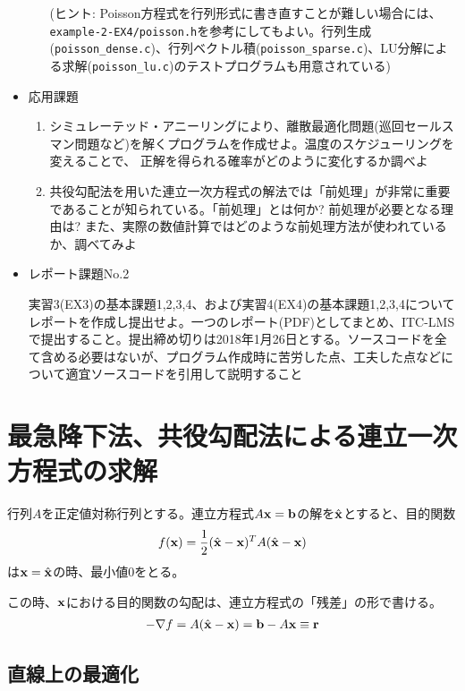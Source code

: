 \documentclass[11pt]{jarticle}
\begin{document}
\begin{itemize}
\begin{enumerate}
    (ヒント: Poisson方程式を行列形式に書き直すことが難しい場合には、{\tt example-2-EX4/poisson.h}を参考にしてもよい。行列生成({\tt poisson\_dense.c})、行列ベクトル積({\tt poisson\_sparse.c})、LU分解による求解({\tt poisson\_lu.c})のテストプログラムも用意されている)
  \end{enumerate}  
\item 応用課題
  \begin{enumerate}
  \item シミュレーテッド・アニーリングにより、離散最適化問題(巡回セールスマン問題など)を解くプログラムを作成せよ。温度のスケジューリングを変えることで、
正解を得られる確率がどのように変化するか調べよ
  \item 共役勾配法を用いた連立一次方程式の解法では「前処理」が非常に重要
であることが知られている。「前処理」とは何か? 前処理が必要となる理由は? また、実際の数値計算ではどのような前処理方法が使われているか、調べてみよ
  \end{enumerate}

\item レポート課題No.2

  実習3(EX3)の基本課題1,2,3,4、および実習4(EX4)の基本課題1,2,3,4についてレポートを作成し提出せよ。一つのレポート(PDF)としてまとめ、ITC-LMSで提出すること。提出締め切りは2018年1月26日とする。ソースコードを全て含める必要はないが、プログラム作成時に苦労した点、工夫した点などについて適宜ソースコードを引用して説明すること
\end{itemize}

\clearpage

\noindent [補足説明]

\section{最急降下法、共役勾配法による連立一次方程式の求解}

行列$A$を正定値対称行列とする。連立方程式$A{\bf x}={\bf b}$の解を$\hat{\bf x}$とすると、目的関数
\begin{align}
f({\bf x}) = \frac{1}{2} (\hat{\bf x} - {\bf x})^T A (\hat{\bf x} - {\bf x})
\end{align}
は${\bf x} = \hat{\bf x}$の時、最小値0をとる。

この時、${\bf x}$における目的関数の勾配は、連立方程式の「残差」の形で書ける。
\begin{align}
-\nabla f = A (\hat{\bf x} - {\bf x}) = {\bf b} - A {\bf x} \equiv {\bf r}
\end{align}

\subsection{直線上の最適化}
\end{document}
